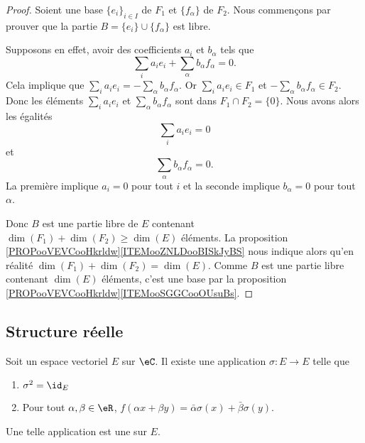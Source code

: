 \begin{proof}
	Soient une base \( \{ e_i \}_{i\in I}\) de \( F_1\) et \( \{ f_{\alpha} \}\) de \( F_2\). Nous commençons par prouver que la partie \( B=\{ e_i \}\cup \{ f_{\alpha} \}\) est libre.

	Supposons en effet, avoir des coefficients \( a_i\) et \( b_{\alpha}\) tels que
	\begin{equation}
		\sum_i a_ie_i+\sum_{\alpha}b_{\alpha}f_{\alpha}=0.
	\end{equation}
	Cela implique que \( \sum_ia_ie_i=-\sum_{\alpha}b_{\alpha}f_{\alpha}\). Or \( \sum_ia_ie_i\in F_1\) et \( -\sum_{\alpha}b_{\alpha}f_{\alpha}\in F_2\). Donc les éléments \( \sum_i a_ie_i\) et \( \sum_{\alpha}b_{\alpha}f_{\alpha}\) sont dans \( F_1\cap F_2=\{ 0 \}\). Nous avons alors les égalités
	\begin{equation}
		\sum_i a_ie_i=0
	\end{equation}
	et
	\begin{equation}
		\sum_{\alpha}b_{\alpha}f_{\alpha}=0.
	\end{equation}
	La première implique \( a_i=0\) pour tout \( i\) et la seconde implique \( b_{\alpha}=0\) pour tout \( \alpha\).

	Donc \( B\) est une partie libre de \( E\) contenant \( \dim(F_1)+\dim(F_2)\geq \dim(E)\) éléments. La proposition \ref{PROPooVEVCooHkrldw}\ref{ITEMooZNLDooBISkJyBS} nous indique alors qu'en réalité \( \dim(F_1)+\dim(F_2)=\dim(E)\). Comme \( B\) est une partie libre contenant \( \dim(E)\) éléments, c'est une base par la proposition \ref{PROPooVEVCooHkrldw}\ref{ITEMooSGGCooOUsuBs}.
\end{proof}

\subsection{Structure réelle}

\begin{propositionDef}         \label{DEFooCIFSooVmcNtE}
	Soit un espace vectoriel \( E\) sur \( \eC\). Il existe une application \( \sigma\colon E\to E\) telle que
	\begin{enumerate}
		\item
		      \( \sigma^2=\id_E\)
		\item
		      Pour tout \( \alpha,\beta\in \eR\), \( f(\alpha x+\beta y)=\bar \alpha \sigma(x)+\bar \beta \sigma(y)\).
	\end{enumerate}
	Une telle application est une  sur \( E\).
\end{propositionDef}

